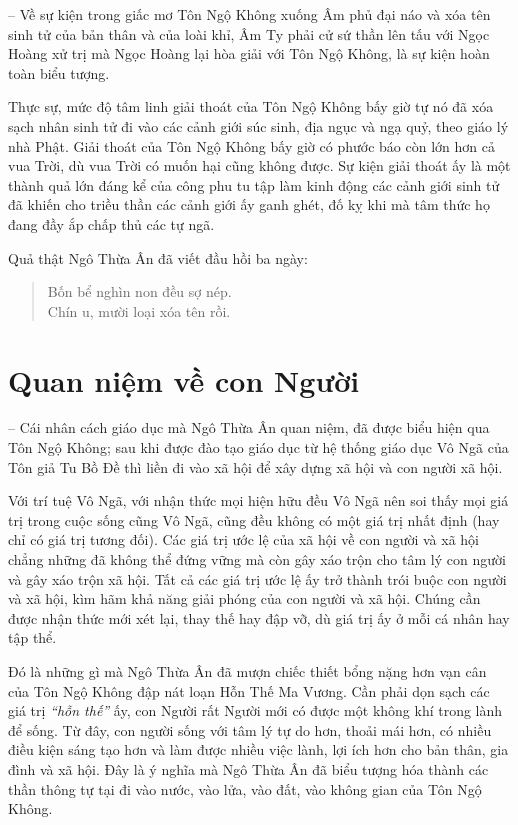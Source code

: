 -- Về sự kiện trong giấc mơ Tôn Ngộ Không xuống Âm phủ đại náo và xóa tên sinh tử của bản thân và của loài khỉ, Âm Ty phải cử sứ thần lên tấu với Ngọc Hoàng xử trị mà Ngọc Hoàng lại hòa giải với Tôn Ngộ Không, là sự kiện hoàn toàn biểu tượng.

Thực sự, mức độ tâm linh giải thoát của Tôn Ngộ Không bấy giờ tự nó đã xóa sạch nhân sinh tử đi vào các cảnh giới súc sinh, địa ngục và ngạ quỷ, theo giáo lý nhà Phật. Giải thoát của Tôn Ngộ Không bấy giờ có phước báo còn lớn hơn cả vua Trời, dù vua Trời có muốn hại cũng không được. Sự kiện giải thoát ấy là một thành quả lớn đáng kể của công phu tu tập làm kinh động các cảnh giới sinh tử đã khiến cho triều thần các cảnh giới ấy ganh ghét, đố kỵ khi mà tâm thức họ đang đầy ắp chấp thủ các tự ngã.

Quả thật Ngô Thừa Ân đã viết đầu hồi ba ngày:

\begin{verse}
\begin{itshape}
Bốn bể nghìn non đều sợ nép.\\
Chín u, mười loại xóa tên rồi.
\end{itshape}
\end{verse}


\section{Quan niệm về con Người} %
\label{sec:3_quan_niem_con_nguoi}

-- Cái nhân cách giáo dục mà Ngô Thừa Ân quan niệm, đã được biểu hiện qua Tôn Ngộ Không; sau khi được đào tạo giáo dục từ hệ thống giáo dục Vô Ngã của Tôn giả Tu Bồ Đề thì liền đi vào xã hội để xây dựng xã hội và con người xã hội.

Với trí tuệ Vô Ngã, với nhận thức mọi hiện hữu đều Vô Ngã nên soi thấy mọi giá trị trong cuộc sống cũng Vô Ngã, cũng đều không có một giá trị nhất định (hay chỉ có giá trị tương đối). Các giá trị ước lệ của xã hội về con người và xã hội chẳng những đã không thể đứng vững mà còn gây xáo trộn cho tâm lý con người và gây xáo trộn xã hội. Tất cả các giá trị ước lệ ấy trở thành trói buộc con người và xã hội, kìm hãm khả năng giải phóng của con người và xã hội. Chúng cần được nhận thức mới xét lại, thay thế hay đập vỡ, dù giá trị ấy ở mỗi cá nhân hay tập thể.

Đó là những gì mà Ngô Thừa Ân đã mượn chiếc thiết bổng nặng hơn vạn cân của Tôn Ngộ Không đập nát loạn Hỗn Thế Ma Vương. Cần phải dọn sạch các giá trị \emph{``hỗn thế''} ấy, con Người rất Người mới có được một không khí trong lành để sống. Từ đây, con người sống với tâm lý tự do hơn, thoải mái hơn, có nhiều điều kiện sáng tạo hơn và làm được nhiều việc lành, lợi ích hơn cho bản thân, gia đình và xã hội. Đây là ý nghĩa mà Ngô Thừa Ân đã biểu tượng hóa thành các thần thông tự tại đi vào nước, vào lửa, vào đất, vào không gian của Tôn Ngộ Không.

